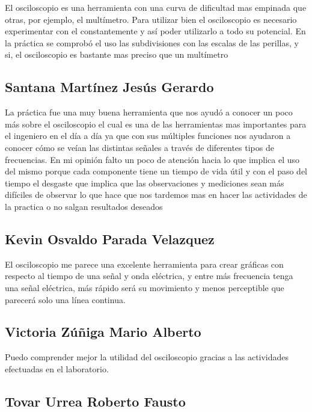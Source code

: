\documentclass[11pt]{article}
\begin{document}
\begin{multicols}{2}
			El osciloscopio es una herramienta con una curva de dificultad mas empinada que otras, por ejemplo, el multímetro. Para utilizar bien el osciloscopio es necesario experimentar con el constantemente y así poder utilizarlo a todo su potencial.
			En la práctica se comprobó el uso las subdivisiones con las escalas de las perillas, y si, el osciloscopio es bastante mas preciso que un multímetro


		\subsection{Santana Martínez Jesús Gerardo}

			La práctica fue una muy buena herramienta que nos ayudó a conocer un poco más sobre el osciloscopio el cual es una de las herramientas mas importantes para el ingeniero en el día a día ya que con sus múltiples funciones nos ayudaron a conocer cómo se veían las distintas señales a través de diferentes tipos de frecuencias. En mi opinión falto un poco de atención hacia lo que implica el uso del mismo porque cada componente tiene un tiempo de vida útil y con el paso del tiempo el desgaste que implica que las observaciones y mediciones sean más difíciles de observar lo que hace que nos tardemos mas en hacer las actividades de la practica o no salgan resultados deseados

		\subsection{Kevin Osvaldo Parada Velazquez}

			El osciloscopio me parece una excelente herramienta para crear gráficas con respecto al tiempo de una señal y onda eléctrica, y entre más frecuencia tenga una señal eléctrica, más rápido será su movimiento y menos perceptible que parecerá solo una línea continua.

		\subsection{Victoria Zúñiga Mario Alberto}

			 Puedo comprender mejor   la utilidad del osciloscopio gracias a las actividades efectuadas en el laboratorio.

		\subsection{Tovar Urrea Roberto Fausto}


\end{multicols}
\end{document}
